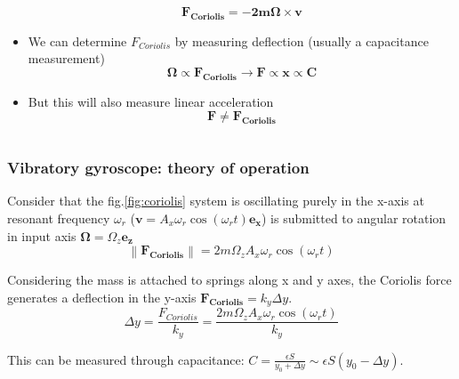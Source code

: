 \documentclass[10pt]{beamer}
\newcommand{\norm}[1]{\left\lVert#1\right\rVert}
\begin{document}
\begin{frame}
\begin{columns}
\begin{column}{.60\textwidth}
\begin{itemize}
            \begin{equation*}
                \mathbf{F_{Coriolis} = - 2 m \mathbf{\Omega} \times \mathbf{v}}
            \end{equation*}
            \item We can determine $F_{Coriolis}$ by measuring deflection (usually a capacitance measurement)
            \begin{equation*}
                \mathbf{\Omega} \propto \mathbf{F_{Coriolis}} \to \mathbf{F} \propto \mathbf{x} \propto \mathbf{C}
            \end{equation*}
            \item But this will also measure linear acceleration
            \begin{equation*}
                \mathbf{F \neq F_{Coriolis}}
            \end{equation*}
        \end{itemize}
    \end{column}
\end{columns}
\end{frame}

\begin{frame}
\frametitle{Vibratory gyroscope: theory of operation}
    Consider that the fig.\ref{fig:coriolis} system is oscillating purely in the x-axis at resonant frequency $\omega_r$ ($\mathbf{v} = A_x \omega_r \cos{(\omega_r t)} \mathbf{e_x}$) is submitted to angular rotation in input axis $\mathbf{\Omega} = \Omega_z \mathbf{e_z}$
    \begin{equation*}
        \norm{\mathbf{F_{Coriolis}}} = 2 m \Omega_z A_x \omega_r \cos{(\omega_r t)}
    \end{equation*}

    Considering the mass is attached to springs along x and y axes, the Coriolis force generates a deflection in the y-axis $\mathbf{F_{Coriolis}} = k_y \Delta y$.
    \begin{equation*}
        \Delta y = \frac{F_{Coriolis}}{k_y} = \frac{2 m \Omega_z A_x \omega_r \cos{(\omega_r t)}}{k_y}
    \end{equation*}

    This can be measured through capacitance: $C = \frac{\epsilon S}{y_0 + \Delta y} \sim \epsilon S (y_0 - \Delta y)$.
\end{frame}
\end{document}
